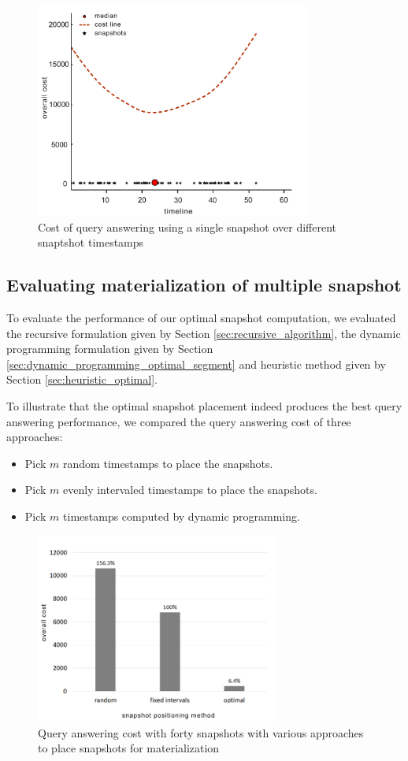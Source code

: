 			\begin{figure}
				\centering
				\includegraphics[width=90mm]{figs/single_snapshot.jpg}
				\caption{Cost of query answering using a single snapshot over different snaptshot timestamps}
				\label{fig:single_snapshot}
			\end{figure} 

		\subsection{Evaluating materialization of multiple snapshot} \label{evaluating_multiple_snapshots}
			To evaluate the performance of our optimal snapshot computation, we evaluated the recursive formulation given
			by Section \ref{sec:recursive_algorithm}, the dynamic programming formulation given by Section \ref{sec:dynamic_programming_optimal_segment} and heuristic method given by Section \ref{sec:heuristic_optimal}. 

			To illustrate that the optimal snapshot placement indeed produces the best query answering performance, we compared the query answering cost of three approaches:
			\begin{itemize}
				\item Pick $m$ random timestamps to place the snapshots.
				\item Pick $m$ evenly intervaled timestamps to place the snapshots.
				\item Pick $m$ timestamps computed by dynamic programming.
			\end{itemize}

			\begin{figure}
				\centering
				\includegraphics[width=80mm]{figs/various_scenarios_cost.jpg}
				\caption{Query answering cost with forty snapshots with various approaches to place snapshots for materialization}
				\label{fig:approaches_cost}
			\end{figure} 

